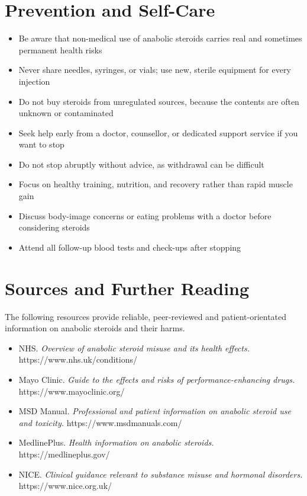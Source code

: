 \section*{Prevention and Self-Care}
\begin{itemize}
    \item Be aware that non-medical use of anabolic steroids carries real and sometimes permanent health risks
    \item Never share needles, syringes, or vials; use new, sterile equipment for every injection
    \item Do not buy steroids from unregulated sources, because the contents are often unknown or contaminated
    \item Seek help early from a doctor, counsellor, or dedicated support service if you want to stop
    \item Do not stop abruptly without advice, as withdrawal can be difficult
    \item Focus on healthy training, nutrition, and recovery rather than rapid muscle gain
    \item Discuss body-image concerns or eating problems with a doctor before considering steroids
    \item Attend all follow-up blood tests and check-ups after stopping
\end{itemize}

\section*{Sources and Further Reading}
The following resources provide reliable, peer-reviewed and patient-orientated information on anabolic steroids and their harms.

\begin{itemize}
    \item NHS. \textit{Overview of anabolic steroid misuse and its health effects.} https://www.nhs.uk/conditions/
    \item Mayo Clinic. \textit{Guide to the effects and risks of performance-enhancing drugs.} https://www.mayoclinic.org/
    \item MSD Manual. \textit{Professional and patient information on anabolic steroid use and toxicity.} https://www.msdmanuals.com/
    \item MedlinePlus. \textit{Health information on anabolic steroids.} https://medlineplus.gov/
    \item NICE. \textit{Clinical guidance relevant to substance misuse and hormonal disorders.} https://www.nice.org.uk/
\end{itemize}
